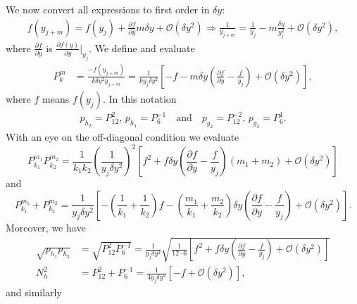 \documentclass{article}
\begin{document}
We now convert all expressions to first
order in $\delta y$:
\begin{align*}
  f(y_{j+m}) =f(y_{j})+\frac{\partial f}{\partial y}m\delta y+\mathcal{O}(\delta y^{2})\Rightarrow
  \frac{1}{y_{j+m}} =\frac{1}{y_{j}}-m\frac{\delta y}{y_{j}^{2}}+\mathcal{O}(\delta y^{2}),
\end{align*}
where $\frac{\partial f}{\partial y}$ is $\frac{\partial f(y)}{\partial y}|_{y_{j}}$.
We define and evaluate
\begin{align*}
  P_{k}^{m} & =\frac{-f(y_{j+m})}{k\delta y^{2}y_{j+m}} =\frac{1}{ky_{j}\delta y^{2}}\left[-f-m\delta y\left(\frac{\partial f}{\partial y}-\frac{f}{y_{j}}\right)+\mathcal{O}(\delta y^{2})\right],
\end{align*}
where $f$ means $f(y_{j})$. In this notation
\begin{align*}
  p_{h_{2}} =P_{12}^{2},\,p_{h_{1}}=P_{6}^{-1}\ \ \ \text{ and }\ \ \
  p_{g_{2}}  =P_{12}^{-2},\,p_{g_{3}}=P_{6}^{1}.
\end{align*}
With an eye on the off-diagonal condition we evaluate
\begin{displaymath}
  P_{k_{1}}^{m_{1}}P_{k_{2}}^{m_{2}}=\frac{1}{k_{1}k_{2}}\left(\frac{1}{y_{j}\delta y^{2}}\right)^{2}\left[f^{2}+f\delta y\left(\frac{\partial f}{\partial y}-\frac{f}{y_{j}}\right)\left(m_{1}+m_{2}\right)+\mathcal{O}(\delta y^{2})\right]
\end{displaymath}
and
\begin{displaymath}
  P_{k_{1}}^{m_{1}}+P_{k_{2}}^{m_{2}}=\frac{1}{y_{j}\delta y^{2}}\left[-\left(\frac{1}{k_{1}}+\frac{1}{k_{2}}\right)f-\left(\frac{m_{1}}{k_{1}}+\frac{m_{2}}{k_{2}}\right)\delta y\left(\frac{\partial f}{\partial y}-\frac{f}{y_{j}}\right)+\mathcal{O}(\delta y^{2})\right].
\end{displaymath}
Moreover, we have
\begin{align*}
  \sqrt{p_{h_{1}}p_{h_{2}}} & =\sqrt{P_{12}^{2}P_{6}^{-1}}=\frac{1}{y_{j}\delta y^{2}}\sqrt{\frac{1}{12\cdot 6}\left[f^{2}+f\delta y\left(\frac{\partial f}{\partial y}-\frac{f}{y_{j}}\right)+\mathcal{O}(\delta y^{2})\right]} \\
  N_{h}^{2}                 & =P_{12}^{2}+P_{6}^{-1}=\frac{1}{4y_{j}\delta y^{2}}\left[-f+\mathcal{O}(\delta y^{2})\right],
\end{align*}
and similarly
\end{document}
